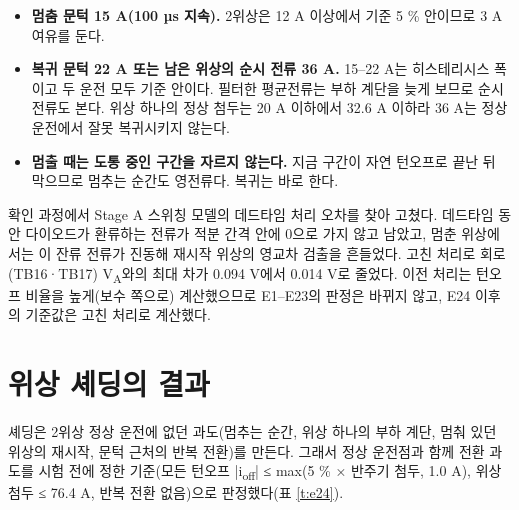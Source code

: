 \begin{itemize}
\item \textbf{멈춤 문턱 15 A(100 µs 지속).} 2위상은 12 A 이상에서 기준 5 \% 안이므로 3 A 여유를 둔다.
\item \textbf{복귀 문턱 22 A 또는 남은 위상의 순시 전류 36 A.} 15–22 A는 히스테리시스 폭이고 두 운전 모두 기준 안이다. 필터한 평균전류는 부하 계단을 늦게 보므로 순시 전류도 본다. 위상 하나의 정상 첨두는 20 A 이하에서 32.6 A 이하라 36 A는 정상 운전에서 잘못 복귀시키지 않는다.
\item \textbf{멈출 때는 도통 중인 구간을 자르지 않는다.} 지금 구간이 자연 턴오프로 끝난 뒤 막으므로 멈추는 순간도 영전류다. 복귀는 바로 한다.
\end{itemize}

확인 과정에서 Stage A 스위칭 모델의 데드타임 처리 오차를 찾아 고쳤다. 데드타임 동안 다이오드가 환류하는 전류가 적분 간격 안에 0으로 가지 않고 남았고, 멈춘 위상에서는 이 잔류 전류가 진동해 재시작 위상의 영교차 검출을 흔들었다. 고친 처리로 회로(TB16·TB17) V\textsubscript{A}와의 최대 차가 0.094 V에서 0.014 V로 줄었다. 이전 처리는 턴오프 비율을 높게(보수 쪽으로) 계산했으므로 E1–E23의 판정은 바뀌지 않고, E24 이후의 기준값은 고친 처리로 계산했다.

\section{위상 셰딩의 결과}

셰딩은 2위상 정상 운전에 없던 과도(멈추는 순간, 위상 하나의 부하 계단, 멈춰 있던 위상의 재시작, 문턱 근처의 반복 전환)를 만든다. 그래서 정상 운전점과 함께 전환 과도를 시험 전에 정한 기준(모든 턴오프 |i\textsubscript{off}| ≤ max(5 \% × 반주기 첨두, 1.0 A), 위상 첨두 ≤ 76.4 A, 반복 전환 없음)으로 판정했다(표 \ref{t:e24}).

